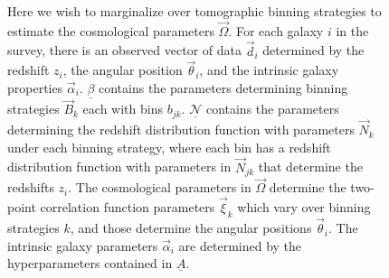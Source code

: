 \documentclass[12pt, onecolumn]{emulateapj}
\newcommand{\textul}{\underline}
\begin{document}
\begin{figure}
\begin{center}
\begin{tikzpicture}[node distance=1cm]
\end{tikzpicture}
\caption{Here we wish to marginalize over tomographic binning strategies to estimate the cosmological parameters $\vec{\Omega}$.  For each galaxy $i$ in the survey, there is an observed vector of data $\vec{d}_{i}$ determined by the redshift $z_{i}$, the angular position $\vec{\theta}_{i}$, and the intrinsic galaxy properties $\vec{\alpha}_{i}$.  $\textul{\beta}$ contains the parameters determining binning strategies $\vec{B}_{k}$ each with bins $b_{jk}$.  $\textul{\mathcal{N}}$ contains the parameters determining the redshift distribution function with parameters $\vec{N}_{k}$ under each binning strategy, where each bin has a redshift distribution function with parameters in $\vec{N}_{jk}$ that determine the redshifts $z_{i}$.  The cosmological parameters in $\vec{\Omega}$ determine the two-point correlation function parameters $\vec{\xi}_{k}$ which vary over binning strategies $k$, and those determine the angular positions $\vec{\theta}_{i}$.  The intrinsic galaxy parameters $\vec{\alpha}_{i}$ are determined by the hyperparameters contained in $\textul{A}$.}
\label{fig:tomo}
\end{center}
\end{figure}
\end{document}
